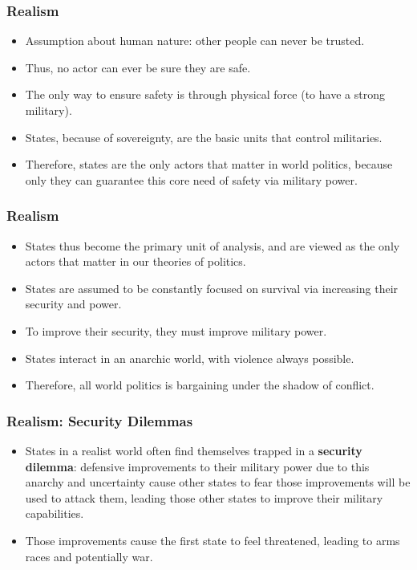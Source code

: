 \documentclass{beamer}
\begin{document}
\begin{frame} 
\frametitle{\LARGE{Realism}}
\begin{itemize}
    \item Assumption about human nature: \pause other people can never be trusted. \pause 
    \item Thus, no actor can ever be sure they are safe. \pause
    \item The only way to ensure safety is through physical force (to have a strong military). \pause
    \item States, because of sovereignty, are the basic units that control militaries. \pause
    \item Therefore, states are the only actors that matter in world politics, because only they can guarantee this core need of safety via military power.
\end{itemize}
\end{frame}

\begin{frame} 
\frametitle{\LARGE{Realism}}
    \begin{itemize}
        \item States thus become the primary unit of analysis, and are viewed as the only actors that matter in our theories of politics. \pause
        \item States are assumed to be constantly focused on survival via increasing their security and power. \pause 
        \item To improve their security, they must improve military power. \pause 
        \item States interact in an anarchic world, with violence always possible. \pause
        \item Therefore, all world politics is bargaining under the shadow of conflict. 
    \end{itemize}
\end{frame}

\begin{frame} 
	\frametitle{\LARGE{Realism: Security Dilemmas}}
	\begin{itemize}
		\item States in a realist world often find themselves trapped in a \textbf{security dilemma}: defensive improvements to their military power due to this anarchy and uncertainty cause other states to fear those improvements will be used to attack them, leading those other states to improve their military capabilities. \pause
		\item Those improvements cause the first state to feel threatened, leading to arms races and potentially war.
	\end{itemize}
\end{frame}
       
\end{document}
